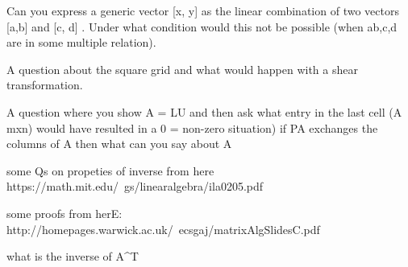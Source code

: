 \documentclass[solution,addpoints,12pt]{exam}
\begin{document}
\begin{questions}

\question Can you express a generic vector [x, y] as the linear combination of two vectors [a,b] and [c, d] . Under what condition would this not be possible (when ab,c,d are in some multiple relation).

\question A question about the square grid and what would happen with a shear transformation.

\question A question where you show A = LU and then ask what entry in the last cell (A mxn) would have resulted in a 0 = non-zero situation)
\question if PA exchanges the columns of A then what can you say about A

\question some Qs on propeties of inverse from here https://math.mit.edu/~gs/linearalgebra/ila0205.pdf

\question some proofs from herE: http://homepages.warwick.ac.uk/~ecsgaj/matrixAlgSlidesC.pdf

\question what is the inverse of A^T

\fi

\end{questions}
\end{document}
